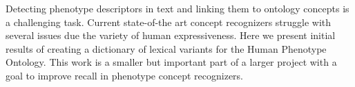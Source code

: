 Detecting phenotype descriptors in text and linking them to ontology concepts is a challenging task. Current state-of-the art concept recognizers struggle with several issues due the variety of human expressiveness. Here we present initial results of creating a dictionary of lexical variants for the Human Phenotype Ontology. This work is a smaller but important part of a larger project with a goal to improve recall in phenotype concept recognizers.
